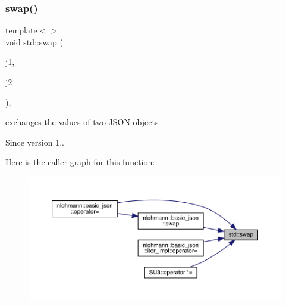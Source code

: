 \subsubsection{\texorpdfstring{swap()}{swap()}}
{\footnotesize\ttfamily template$<$$>$ \\
void std\+::swap (\begin{DoxyParamCaption}\item[{\mbox{\hyperlink{namespacenlohmann_a2bfd99e845a2e5cd90aeaf1b1431f474}{nlohmann\+::json}} \&}]{j1,  }\item[{\mbox{\hyperlink{namespacenlohmann_a2bfd99e845a2e5cd90aeaf1b1431f474}{nlohmann\+::json}} \&}]{j2 }\end{DoxyParamCaption})\hspace{0.3cm}{\ttfamily [inline]}, {\ttfamily [noexcept]}}



exchanges the values of two J\+S\+ON objects 

\begin{DoxySince}{Since}
version 1.. 
\end{DoxySince}
Here is the caller graph for this function\+:\nopagebreak
\begin{figure}[H]
\begin{center}
\leavevmode
\includegraphics[width=350pt]{namespacestd_a907191b7578e209391ce938e3b2afdf7_icgraph}
\end{center}
\end{figure}

